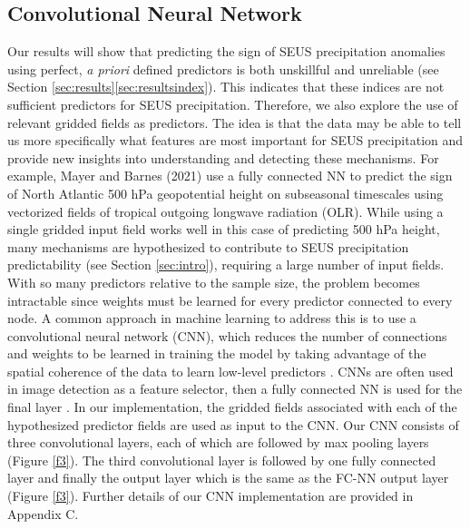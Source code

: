 \documentclass{ametsocV6.1}
\begin{document}
\subsection{Convolutional Neural Network}
\label{sec:cnn}

Our results will show that predicting the sign of SEUS precipitation anomalies using perfect, \emph{a priori} defined predictors is both unskillful and unreliable (see Section \ref{sec:results}\ref{sec:resultsindex}). This indicates that these indices are not sufficient predictors for SEUS precipitation. Therefore, we also explore the use of relevant gridded fields as predictors. The idea is that the data may be able to tell us more specifically what features are most important for SEUS precipitation and provide new insights into understanding and detecting these mechanisms. For example, Mayer and Barnes (2021) use a fully connected NN to predict the sign of North Atlantic 500 hPa geopotential height on subseasonal timescales using vectorized fields of tropical outgoing longwave radiation (OLR). While using a single gridded input field works well in this case of predicting 500 hPa height, many mechanisms are hypothesized to contribute to SEUS precipitation predictability (see Section \ref{sec:intro}), requiring a large number of input fields. With so many predictors relative to the sample size, the problem becomes intractable since weights must be learned for every predictor connected to every node. A common approach in machine learning to address this is to use a convolutional neural network (CNN), which reduces the number of connections and weights to be learned in training the model by taking advantage of the spatial coherence of the data to learn low-level predictors \citep{krizhevsky_imagenet_2012}. CNNs are often used in image detection as a feature selector, then a fully connected NN is used for the final layer \citep[e.g.,][]{krizhevsky_imagenet_2012,zeiler_visualizing_2013}. In our implementation, the gridded fields associated with each of the hypothesized predictor fields are used as input to the CNN. Our CNN consists of three convolutional layers, each of which are followed by max pooling layers (Figure \ref{f3}). The third convolutional layer is followed by one fully connected layer and finally the output layer which is the same as the FC-NN output layer (Figure \ref{f3}). Further details of our CNN implementation are provided in Appendix C.
\end{document}
